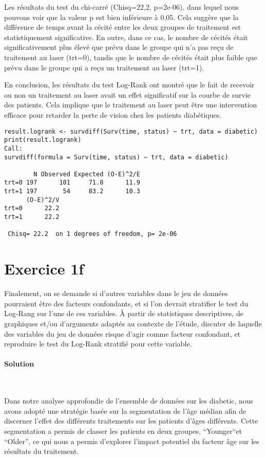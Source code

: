 \documentclass[../main.tex]{subfiles}
\begin{document}
\begin{CJK*}{UTF8}{gbsn}
Les résultats du test du chi-carré (Chisq=22,2, p=2e-06), dans lequel nous pouvons voir que la valeur p est bien inférieure à 0,05. Cela suggère que la différence de temps avant la cécité entre les deux groupes de traitement est statistiquement significative. En outre, dans ce cas, le nombre de cécités était significativement plus élevé que prévu dans le groupe qui n'a pas reçu de traitement au laser (trt=0), tandis que le nombre de cécités était plus faible que prévu dans le groupe qui a reçu un traitement au laser (trt=1).

En conclusion, les résultats du test Log-Rank ont montré que le fait de recevoir ou non un traitement au laser avait un effet significatif sur la courbe de survie des patients. Cela implique que le traitement au laser peut être une intervention efficace pour retarder la perte de vision chez les patients diabétiques.

\begin{lstlisting}
result.logrank <- survdiff(Surv(time, status) ~ trt, data = diabetic)
print(result.logrank)
Call:
survdiff(formula = Surv(time, status) ~ trt, data = diabetic)

        N Observed Expected (O-E)^2/E
trt=0 197      101     71.8      11.9
trt=1 197       54     83.2      10.3
      (O-E)^2/V
trt=0      22.2
trt=1      22.2

 Chisq= 22.2  on 1 degrees of freedom, p= 2e-06 
\end{lstlisting}

\section*{Exercice 1f}
Finalement, on se demande si d'autres variables
dans le jeu de données pourraient être des facteurs confondants, et si l'on devrait stratifier le
test du Log-Rang sur l'une de ces variables. À partir de statistiques descriptives, de graphiques
et/ou d'arguments adaptés au contexte de l'étude, discuter de laquelle des variables du jeu de
données risque d'agir comme facteur confondant, et reproduire le test du Log-Rank stratifié pour cette variable.

\paragraph{Solution}\

Dans notre analyse approfondie de l'ensemble de données sur les diabetic, nous avons adopté une stratégie basée sur la segmentation de l'âge médian afin de discerner l'effet des différents traitements sur les patients d'âges différents. Cette segmentation a permis de classer les patients en deux groupes, “Younger“et “Older”, ce qui nous a permis d'explorer l'impact potentiel du facteur âge sur les résultats du traitement.


\end{CJK*}
\end{document}
